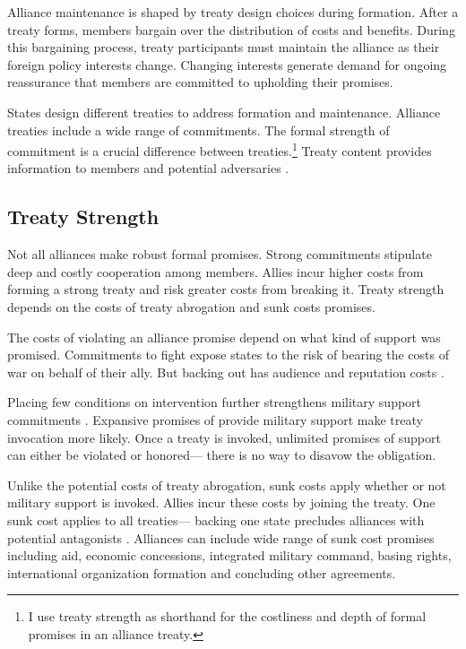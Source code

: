 \documentclass[12pt]{article}
\begin{document}
Alliance maintenance is shaped by treaty design choices during formation. 
After a treaty forms, members bargain over the distribution of costs and benefits.
During this bargaining process, treaty participants must maintain the alliance as their foreign policy interests change. 
Changing interests generate demand for ongoing reassurance that members are committed to upholding their promises. 


States design different treaties to address formation and maintenance. 
Alliance treaties include a wide range of commitments. 
The formal strength of commitment is a crucial difference between treaties.\footnote{I use treaty strength as shorthand for the costliness and depth of formal promises in an alliance treaty.} 
Treaty content provides information to members and potential adversaries \citep{Leeds2003}. 



\subsection{Treaty Strength}


Not all alliances make robust formal promises. 
Strong commitments stipulate deep and costly cooperation among members.
Allies incur higher costs from forming a strong treaty and risk greater costs from breaking it. 
Treaty strength depends on the costs of treaty abrogation and sunk costs promises. 


The costs of violating an alliance promise depend on what kind of support was promised. 
Commitments to fight expose states to the risk of bearing the costs of war on behalf of their ally. 
But backing out has audience \citep{Levyetal2015} and reputation costs \citep{Gibler2008, Crescenzietal2012, Mattes2012}. 


Placing few conditions on intervention further strengthens military support commitments \citep{Benson2012}. 
Expansive promises of provide military support make treaty invocation more likely. 
Once a treaty is invoked, unlimited promises of support can either be violated or honored--- there is no way to disavow the obligation. 


Unlike the potential costs of treaty abrogation, sunk costs apply whether or not military support is invoked. 
Allies incur these costs by joining the treaty. 
One sunk cost applies to all treaties--- backing one state precludes alliances with potential antagonists \citep{Snyder1997}. 
Alliances can include wide range of sunk cost promises including aid, economic concessions, integrated military command, basing rights, international organization formation and concluding other agreements. 
\end{document}
